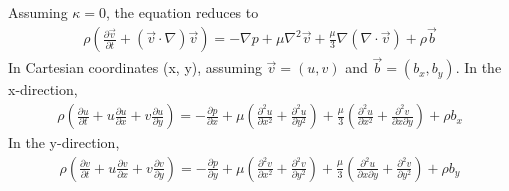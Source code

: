 \subsection{}
Assuming $\kappa = 0$, the equation reduces to 
\begin{align*}
    \rho \left(\frac{\partial \vec{v}}{\partial t}
    + (\vec{v} \cdot \nabla) \vec{v} \right) = -\nabla p + \mu \nabla^2 \vec{v}
    + \frac{\mu}{3} \nabla (\nabla \cdot \vec{v}) + \rho \vec{b}
\end{align*}
In Cartesian coordinates (x, y), assuming $\vec{v} = (u, v)$ and $\vec{b} = (b_x, b_y)$.
In the x-direction,
\begin{align*}
    \boxed{
    \rho \left(\frac{\partial u}{\partial t} + u \frac{\partial u}{\partial x} 
    + v \frac{\partial u}{\partial y} \right) = -\frac{\partial p}{\partial x} 
    + \mu \left(\frac{\partial^2 u}{\partial x^2} + \frac{\partial^2 u}{\partial y^2} \right)
    + \frac{\mu}{3} \left(\frac{\partial^2 u}{\partial x^2} + \frac{\partial^2 v}{\partial x \partial y} \right)
    + \rho b_x 
    }
\end{align*}
In the y-direction,
\begin{align*}
    \boxed{
    \rho \left(\frac{\partial v}{\partial t} + u \frac{\partial v}{\partial x} 
    + v \frac{\partial v}{\partial y} \right) = -\frac{\partial p}{\partial y} 
    + \mu \left(\frac{\partial^2 v}{\partial x^2} + \frac{\partial^2 v}{\partial y^2} \right)
    + \frac{\mu}{3} \left(\frac{\partial^2 u}{\partial x \partial y} + \frac{\partial^2 v}{\partial y^2} \right)
    + \rho b_y 
    }
\end{align*}

